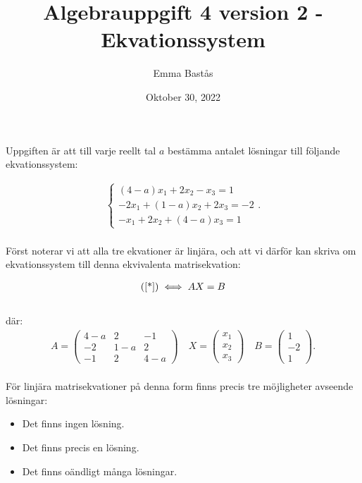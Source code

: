 \documentclass{article}
\title{Algebrauppgift 4 version 2 - Ekvationssystem}
\author{Emma Bastås}
\date{Oktober 30, 2022}
\begin{document}
\maketitle

\noindent Uppgiften är att till varje reellt tal $a$ bestämma antalet lösningar till följande ekvationssystem:

\begin{gather*}
  \begin{cases}
  (4 - a)x_{1} + 2x_{2} - x_{3} = 1\\
  -2x_{1} + (1 - a)x_{2} + 2x_{3} = -2\\
  -x_{1} + 2x_{2} + (4 - a)x_{3} = 1
  \end{cases}\text{.} \tag{$\star$}\label{*}
\end{gather*}
\\
Först noterar vi att alla tre ekvationer är linjära, och att vi därför kan skriva om ekvationssystem till denna ekvivalenta matrisekvation:

\begin{gather*}
  \text{(\ref{*})} \iff AX = B
\end{gather*}
\\
där:
\begin{gather*}
  A =
  \begin{pmatrix}
    4 - a & 2 & - 1 \\
    -2 & 1 - a & 2 \\
    -1 & 2 & 4 - a
  \end{pmatrix}\quad
  X =
  \begin{pmatrix}
    x_{1} \\
    x_{2} \\
    x_{3}
  \end{pmatrix}\quad
  B =
  \begin{pmatrix}
    1 \\
    -2 \\
    1
  \end{pmatrix}\text{.}
\end{gather*}
\\
För linjära matrisekvationer på denna form finns precis tre möjligheter avseende lösningar:
\begin{itemize}
  \item Det finns ingen lösning.
  \item Det finns precis en lösning.
  \item Det finns oändligt många lösningar.
\end{itemize}
\end{document}

